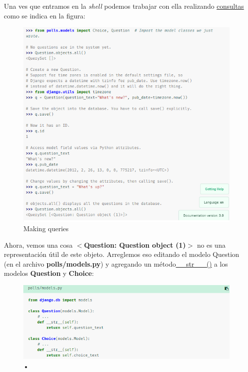 \documentclass[10pt]{article}
\begin{document}
Una ves que entramos en la \textit{shell} podemos trabajar con ella realizando {\href{https://docs.djangoproject.com/en/3.0/topics/db/queries/}{\textcolor{B}{consultas}}} como se indica en la figura:
\begin{figure}[H]
\begin{center}
\renewcommand{\arraystretch}{1.3}
\includegraphics[scale=1.1]{figuras/324/img1.png}
\caption{Making queries}
\end{center}
\end{figure}


Ahora, vemos una cosa \textbf{$<$Question: Question object (1)$>$} no es una representación útil de este objeto. Arreglemos eso editando el modelo Question (en el archivo \textbf{polls/models.py}) y agregando un método{\href{https://docs.djangoproject.com/en/3.0/ref/models/instances/\#django.db.models.Model.\_\_str\_\_()}{\textcolor{B}{\_\_str \_\_()}}}  a los modelos \textbf{Question} y \textbf{Choice}:
\newpage
\begin{figure}[H]
\begin{center}
\renewcommand{\arraystretch}{1.3}
\includegraphics[scale=1]{figuras/324/img2.png}
\caption{•}
\end{center}
\end{figure}
\end{document}
